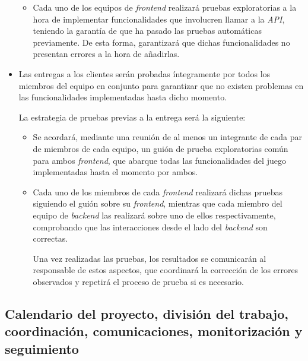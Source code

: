 \documentclass[11pt, a4paper, titlepage]{article}
\begin{document}
\begin{itemize}
\begin{itemize}
        \item Cada uno de los equipos de \textit{frontend} realizará pruebas exploratorias a la hora de implementar funcionalidades que involucren llamar a la \textit{API}, teniendo la garantía de que ha pasado las pruebas automáticas previamente. De esta forma, garantizará que dichas funcionalidades no presentan errores a la hora de añadirlas.
        \end{itemize}


    \item Las entregas a los clientes serán probadas íntegramente por todos los miembros del equipo en conjunto para garantizar que no existen problemas en las funcionalidades implementadas hasta dicho momento.

    La estrategia de pruebas previas a la entrega será la siguiente:
    \begin{itemize}
        \item Se acordará, mediante una reunión de al menos un integrante de cada par de miembros de cada equipo, un guión de prueba exploratorias común para ambos \textit{frontend}, que abarque todas las funcionalidades del juego implementadas hasta el momento por ambos.

        \item Cada uno de los miembros de cada \textit{frontend} realizará dichas pruebas siguiendo el guión sobre su \textit{frontend}, mientras que cada miembro del equipo de \textit{backend} las realizará sobre uno de ellos respectivamente, comprobando que las interacciones desde el lado del \textit{backend} son correctas.

        Una vez realizadas las pruebas, los resultados se comunicarán al responsable de estos aspectos, que coordinará la corrección de los errores observados y repetirá el proceso de prueba si es necesario.
    \end{itemize}
\end{itemize}

\subsection{Calendario del proyecto, división del trabajo, coordinación, comunicaciones, monitorización y seguimiento}

\end{document}
